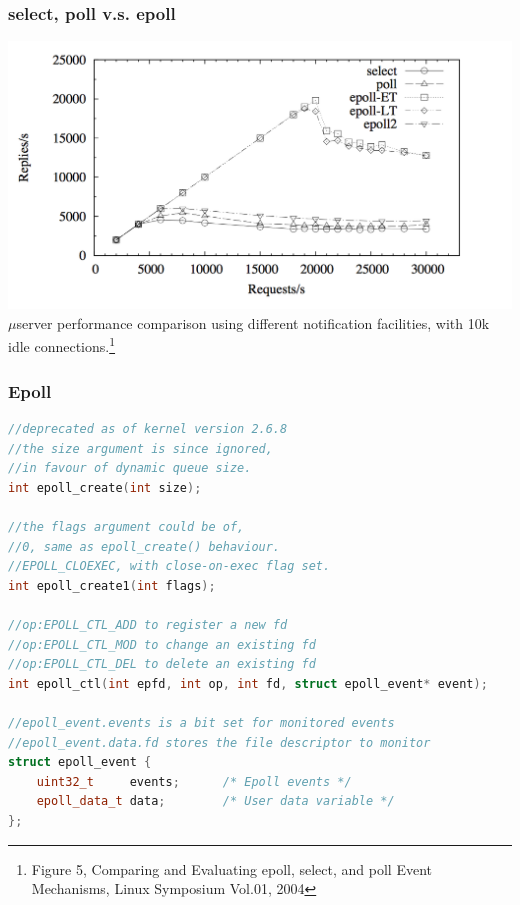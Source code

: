 \documentclass[aspectratio=43]{beamer}
\begin{document}
\begin{frame}[fragile]
  \frametitle{select, poll v.s. epoll}
  \begin{center}
  \includegraphics[scale=0.5]{select_poll_epoll_perf.png}\\
  {\tiny $\mu$server performance comparison using different notification facilities, with 10k idle connections.\footnote{\tiny Figure 5, Comparing and Evaluating epoll, select, and poll Event Mechanisms, Linux Symposium Vol.01, 2004}}
  \end{center}
\end{frame}

\begin{frame}[fragile]
  \frametitle{Epoll}
    \begin{lstlisting}[language=C++,basicstyle=\ttfamily\scriptsize,commentstyle=\color{commgreen},keywordstyle=\color{blue},breaklines=true]
//deprecated as of kernel version 2.6.8
//the size argument is since ignored,
//in favour of dynamic queue size.
int epoll_create(int size);

//the flags argument could be of,
//0, same as epoll_create() behaviour.
//EPOLL_CLOEXEC, with close-on-exec flag set.
int epoll_create1(int flags);

//op:EPOLL_CTL_ADD to register a new fd
//op:EPOLL_CTL_MOD to change an existing fd
//op:EPOLL_CTL_DEL to delete an existing fd
int epoll_ctl(int epfd, int op, int fd, struct epoll_event* event);

//epoll_event.events is a bit set for monitored events
//epoll_event.data.fd stores the file descriptor to monitor
struct epoll_event {
    uint32_t     events;      /* Epoll events */
    epoll_data_t data;        /* User data variable */
};

\end{lstlisting}
\end{frame}
\end{document}
